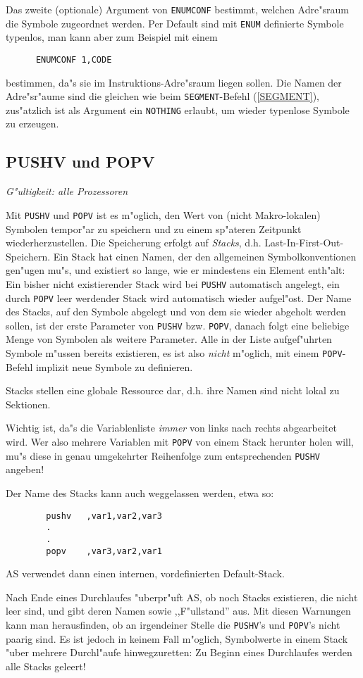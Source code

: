 \documentclass[12pt,a4paper,twoside]{report}
\makeatletter
\newcommand{\tty}[1]{{\tt #1}}
\newcommand{\ttindex}[1]{\index{#1@{\tt #1}}}
\makeatother
\begin{document}
Das zweite (optionale) Argument von \tty{ENUMCONF} bestimmt,
welchen Adre"sraum die Symbole zugeordnet werden.  Per Default
sind mit \tty{ENUM} definierte Symbole typenlos, man kann aber
zum Beispiel mit einem
\begin{verbatim}
      ENUMCONF 1,CODE
\end{verbatim}  
bestimmen, da"s sie im Instruktions-Adre"sraum liegen sollen.  Die
Namen der Adre"sr"aume sind die gleichen wie beim
\tty{SEGMENT}-Befehl (\ref{SEGMENT}), zus"atzlich ist als
Argument ein \tty{NOTHING} erlaubt, um wieder typenlose Symbole
zu erzeugen.


\subsection{PUSHV und POPV}
\ttindex{PUSHV}\ttindex{POPV}

{\em G"ultigkeit: alle Prozessoren}

Mit \tty{PUSHV} und \tty{POPV} ist es m"oglich, den Wert von (nicht
Makro-lokalen) Symbolen tempor"ar zu speichern und zu einem sp"ateren
Zeitpunkt wiederherzustellen.  Die Speicherung erfolgt auf {\em Stacks},
d.h. Last-In-First-Out-Speichern.  Ein Stack hat einen Namen, der den
allgemeinen Symbolkonventionen gen"ugen mu"s, und existiert so lange,
wie er mindestens ein Element enth"alt: Ein bisher nicht existierender
Stack wird bei \tty{PUSHV} automatisch angelegt, ein durch \tty{POPV} leer
werdender Stack wird automatisch wieder aufgel"ost.  Der Name des Stacks,
auf den Symbole abgelegt und von dem sie wieder abgeholt werden sollen,
ist der erste Parameter von \tty{PUSHV} bzw. \tty{POPV}, danach folgt
eine beliebige Menge von Symbolen als weitere Parameter.  Alle in der
Liste aufgef"uhrten Symbole m"ussen bereits existieren, es ist also
{\em nicht} m"oglich, mit einem \tty{POPV}-Befehl implizit neue Symbole
zu definieren.
\par
Stacks stellen eine globale Ressource dar, d.h. ihre Namen sind
nicht lokal zu Sektionen.
\par
Wichtig ist, da"s die Variablenliste {\em immer} von links nach rechts
abgearbeitet wird.  Wer also mehrere Variablen mit \tty{POPV} von einem
Stack herunter holen will, mu"s diese in genau umgekehrter Reihenfolge
zum entsprechenden \tty{PUSHV} angeben!
\par
Der Name des Stacks kann auch weggelassen werden, etwa so:
\begin{verbatim}
        pushv   ,var1,var2,var3
        .
        .
        popv    ,var3,var2,var1
\end{verbatim}
AS verwendet dann einen internen, vordefinierten Default-Stack.
\par
Nach Ende eines Durchlaufes "uberpr"uft AS, ob noch Stacks existieren,
die nicht leer sind, und gibt deren Namen sowie ,,F"ullstand'' aus.  Mit
diesen Warnungen kann man herausfinden, ob an irgendeiner Stelle die
\tty{PUSHV}'s und \tty{POPV}'s nicht paarig sind.  Es ist jedoch in
keinem Fall m"oglich, Symbolwerte in einem Stack "uber mehrere Durchl"aufe
hinwegzuretten: Zu Beginn eines Durchlaufes werden alle Stacks geleert!
\end{document}
